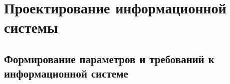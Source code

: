 \section{Проектирование информационной системы}

\subsection{Формирование параметров и требований к информационной системе}

\pagebreak